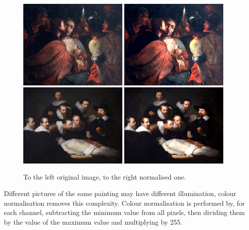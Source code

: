 \documentclass[11pt,a4paper]{report}
\begin{document}
\begin{multicols}{2}
\begin{figure}[tbp]
\centering
\includegraphics[width=0.48\textwidth]{nirp_caravaggio_1962_139_1}
\includegraphics[width=0.48\textwidth]{caravaggio_1962_139_1}
\includegraphics[width=0.48\textwidth]{nirp_rembrandt_eu_464}
\includegraphics[width=0.48\textwidth]{rembrandt_eu_464}
\caption[Colour normalisation]{To the left original image, to the right
normalised one.}
\label{norm}
\end{figure}

Different pictures of the same painting may have different illumination, colour
normalisation removes this complexity.  Colour normalisation is performed by,
for each channel, subtracting the minimum value from all pixels, then dividing
them by the value of the maximum value and multiplying by 255.


\end{multicols}
\end{document}
